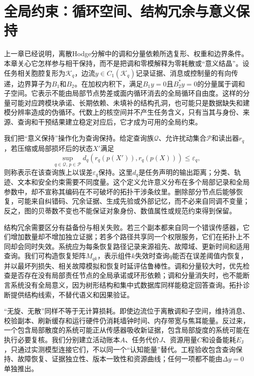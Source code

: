 \section{全局约束：循环空间、结构冗余与意义保持}
\label{sec:topological_endpoint_harmonic_flow}

上一章已经说明，离散Hodge分解中的调和分量依赖所选复形、权重和边界条件。本章关心它怎样参与相干保持，而不是把调和零模解释为零耗散或“意义结晶”。设任务相关胞腔复形为$\mathcal K_q$，边流$y\in C_1(\mathcal K_q)$记录证据、消息或控制量的有向传递，边界算子为$B_1$和$B_2$。在加权内积下，满足$B_1y=0$且$B_2^\ast y=0$的分量属于调和子空间。它表示不能由局部节点势差或面内循环消去的全局循环自由度。这样的分量可能对应跨模块承诺、长期依赖、未填补的结构孔洞，也可能只是数据缺失和建模分辨率造成的伪循环。代数上的核空间并不产生任务含义，只有当其与身份、来源、查询和干预结果建立稳定对应后，它才成为可用的全局约束。

我们把“意义保持”操作化为查询保持。给定查询族$\mathcal Q$、允许扰动集合$\mathcal P$和读出器$r_q$，若压缩或局部损坏后的状态$X'$满足
\begin{equation}
\sup_{q\in\mathcal Q,\,p\in\mathcal P}
d_q\!\left(r_q(p(X')),r_q(p(X))\right)\leq\varepsilon_q,
\label{eq:meaning_query_preservation}
\end{equation}
则称表示在该查询族上以误差$\varepsilon_q$保持。这里$d_q$是任务声明的输出距离；分类、轨迹、文本和安全约束需要不同度量。这个定义允许意义分布在多个局部记录和全局参数中，却不宣称其编码在不可破坏的拓扑干涉条纹里。删除部分节点后能够恢复，可能来自纠错码、冗余证据、生成先验或外部记忆，而不必来自同调不变量；反之，图的贝蒂数不变也不能保证对象身份、数值属性或规范约束得到保留。

结构冗余需要区分有益备份与相关失败。若三个副本都来自同一个错误传感器，它们增加数量却不增加独立证据；若多个路径共享同一个权限服务，它们在拓扑上不同却会同时失效。系统应为每条恢复路径记录来源祖先、故障域、更新时间和适用查询。我们可构造恢复矩阵$M_{qk}$，表示组件$k$失效时查询$q$能否在误差阈值内恢复，并以最坏列损失、相关故障模拟和恢复时延评估鲁棒性。调和分量较大时，优先检查是否存在没有局部责任节点的全局承诺或环形依赖；调和分量消失时，也不能断言系统没有全局意义，因为树形结构和集中式数据库同样能稳定回答查询。拓扑诊断提供结构线索，不替代语义和因果验证。

“无旋、无散”同样不等于无计算损耗。即使边流位于离散调和子空间，维持消息、校验副本、刷新缓存和运行硬件仍消耗墙钟时间、内存带宽与焦耳能量。反过来，一个包含局部散度的系统可能正从传感器吸收新证据，包含局部旋度的系统可能在执行必要复核。我们分别建立活动账本$A$、任务代价$J$、资源用量$C$和设备能耗$E_{\mathrm{J}}$，只通过实测模型连接它们，不以同一个“认知能量”替代。工程验收包含查询保持、故障恢复、证据独立性、版本一致性和资源曲线；任何一项都不能由$\Delta y=0$单独推出。

